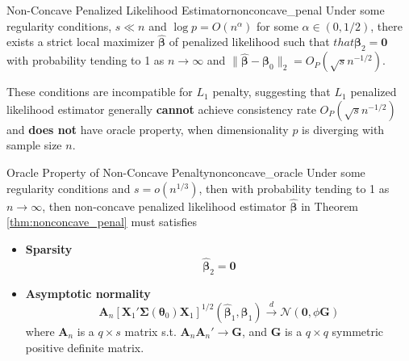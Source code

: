 \documentclass[twoside]{article}
\begin{document}
\begin{theorem}{Non-Concave Penalized Likelihood Estimator}{nonconcave_penal}
    Under some regularity conditions, $s\ll n$ and $\log p = O(n^{\alpha})$ for some $\alpha \in (0,1/2)$, there exists a strict local maximizer $\hat{\boldsymbol{\beta}}$ of penalized likelihood such that $that{\boldsymbol{\beta}}_2=\mathbf{0}$ with probability tending to 1 as $n\rightarrow \infty$ and $\lVert \hat{\boldsymbol{\beta}}-\boldsymbol{\beta}_0 \rVert _2=O_P(\sqrt{s}n^{-1/2})$.
\end{theorem}
These conditions are incompatible for $L_1$ penalty, suggesting that $L_1$ penalized likelihood estimator generally \textbf{cannot} achieve consistency rate $O_P(\sqrt{s}n^{-1/2})$ and \textbf{does not} have oracle property, when dimensionality $p$ is diverging with sample size $n$.

\begin{theorem}{Oracle Property of Non-Concave Penalty}{nonconcave_oracle}
    Under some regularity conditions and $s=o(n^{1/3})$, then with probability tending to 1 as $n\rightarrow \infty$, then non-concave penalized likelihood estimator $\hat{\boldsymbol{\beta}}$ in Theorem \ref{thm:nonconcave_penal} must satisfies 
    \begin{itemize}
        \item \textbf{Sparsity} $$\hat{\boldsymbol{\beta}}_2 =\mathbf{0}$$
        \item \textbf{Asymptotic normality} $$ \mathbf{A}_n \left[ \mathbf{X}_1' \boldsymbol{\Sigma}(\boldsymbol{\theta}_0)\mathbf{X}_1 \right]^{1/2}(\hat{\boldsymbol{\beta}}_1,\boldsymbol{\beta}_1) \xrightarrow{d} \mathcal{N}(\mathbf{0},\phi\mathbf{G}) $$
        where $\mathbf{A}_n$ is a $q\times s$ matrix s.t. $\mathbf{A}_n\mathbf{A}_n'\rightarrow \mathbf{G}$, and $\mathbf{G}$ is a $q\times q$ symmetric positive definite matrix.
    \end{itemize}
\end{theorem}

\newpage


\end{document}
